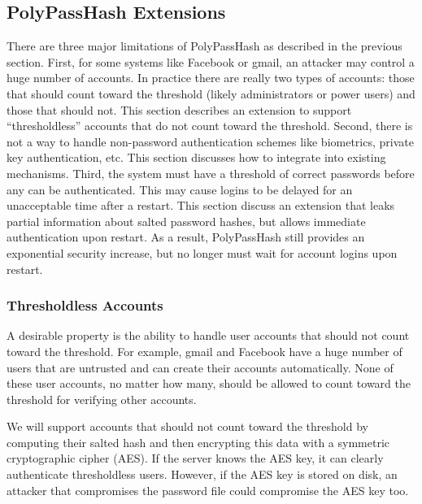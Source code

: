 \subsection{PolyPassHash Extensions}
\label{sec-extensions}

There are three major limitations of PolyPassHash as described in the previous
section.   
First, for some systems like Facebook or gmail, an attacker may control a
huge number of accounts.  In practice there are really two 
types of accounts: those that should count toward the threshold (likely 
administrators or power users) and those that should not.   This section
describes an extension to support ``thresholdless'' accounts that do not 
count toward the threshold.
Second, there is not a way to handle non-password authentication schemes
like biometrics, private key authentication, etc.   This section 
discusses how to integrate into existing mechanisms.   
Third, the system
must have a threshold of correct passwords before any can be authenticated.
This may cause logins to be delayed for an unacceptable time after a restart.
This section discuss an extension that leaks partial information about salted 
password hashes, but allows immediate authentication upon restart.   As a 
result, PolyPassHash still provides an exponential security increase, but 
no longer must wait for account logins upon restart.




\subsubsection{Thresholdless Accounts}
\label{sec-thresholdless}

A desirable property is the ability to handle user accounts that should
not count toward the threshold.  For example, gmail and Facebook have 
a huge number of users that are untrusted and can create their accounts 
automatically.   None of these user accounts, no matter how many, should be
allowed to count toward the threshold for verifying other accounts.   

We will support accounts that should not count toward the threshold by
computing their salted hash and then encrypting this data with
a symmetric cryptographic cipher (AES).   If the server knows the AES key, 
it can clearly authenticate thresholdless users.
However, if the AES key is stored on
disk, an attacker that compromises the password file could compromise the
AES key too.   

